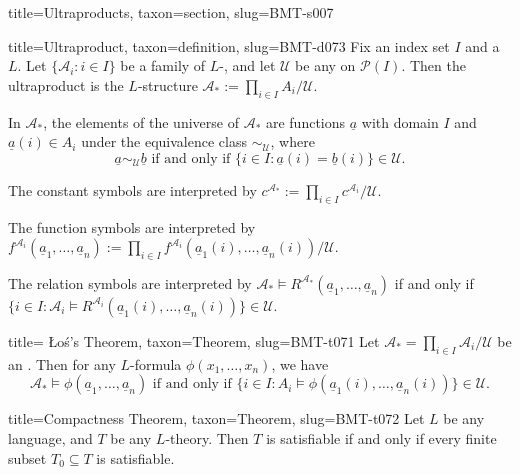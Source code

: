 \documentclass[a4paper]{article}
\begin{document}
\begin{tree}{title={Ultraproducts}, taxon={section}, slug={BMT-s007}}
\begin{tree}{title={Ultraproduct}, taxon={definition}, slug={BMT-d073}}
Fix an index set \(I\) and a  \(L\). Let \(\{ \mathcal {A}_i: i \in  I \}\) be a family of \(L\)-, and let \(\mathcal {U}\) be any  on \(\mathcal {P}(I)\). Then the ultraproduct is the \(L\)-structure \(\mathcal {A}_* :=  \prod \limits _{i \in  I} A_i / \mathcal {U}\). \par{In \(\mathcal {A}_*\), the elements of the universe of \(\mathcal {A}_*\) are functions \(\underline {a}\) with domain \(I\) and \(\underline {a}(i) \in  A_i\) under the equivalence class \(\sim _{ \mathcal {U}}\), where \[\underline {a} \sim _{ \mathcal {U}} \underline {b}  \text { if and only if } \{ i \in  I:  \underline {a}(i)= \underline {b}(i) \}   \in   \mathcal {U}.\]}\par{The constant symbols are interpreted by \(c^{ \mathcal {A}_*} :=  \prod \limits _{i \in  I} c^{ \mathcal {A}_i} / \mathcal {U}\). }\par{The function symbols are interpreted by \(f^{ \mathcal {A}_i}( \underline {a}_1, \dots ,  \underline {a}_n) :=  \prod \limits _{i \in  I} f^{ \mathcal {A}_i}( \underline {a}_1(i), \dots , \underline {a}_n(i)) /  \mathcal {U} \). }\par{The relation symbols are interpreted by \(\mathcal {A}_* \models  R^{ \mathcal {A}_*}( \underline {a}_1, \dots ,  \underline {a}_n)\) if and only if \(\{ i \in  I:  \mathcal {A}_i \models  R^{ \mathcal {A}_i}( \underline {a}_1(i), \dots ,  \underline {a}_n(i)) \} \in   \mathcal {U}\).}
\end{tree}

\begin{tree}{title={ Łoś's Theorem}, taxon={Theorem}, slug={BMT-t071}}
Let \(\mathcal {A}_* =  \prod \limits _{i \in  I}  \mathcal {A}_i /  \mathcal {U}\) be an . Then for any \(L\)-formula \(\phi (x_1, \dots ,x_n)\), we have \[\mathcal {A}_* \models   \phi ( \underline {a}_1, \dots , \underline {a}_n)  \text { if and only if }  \{ i \in  I: A_i \models \phi ( \underline {a}_1(i), \dots ,  \underline {a}_n(i)) \} \in \mathcal {U}.\]
\end{tree}

\begin{tree}{title={Compactness Theorem}, taxon={Theorem}, slug={BMT-t072}}
Let \(L\) be any language, and \(T\) be any \(L\)-theory. Then \(T\) is satisfiable if and only if every finite subset \(T_0 \subseteq  T\) is satisfiable.
\end{tree}

\end{tree}
\end{document}

